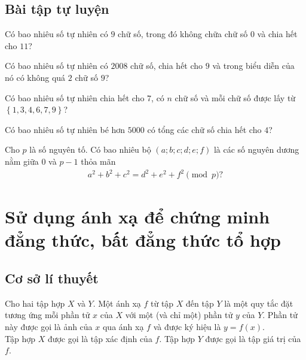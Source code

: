 \subsection{Bài tập tự luyện}
\begin{bt}
	Có bao nhiêu số tự nhiên có $ 9 $ chữ số, trong đó không chữa chữ số $ 0 $ và chia hết cho $ 11 $?
\end{bt}

\begin{bt}[VMO 2008]
	Có bao nhiêu số tự nhiên có $ 2008 $ chữ số, chia hết cho $ 9 $ và trong biểu diễn của nó có không quá $ 2 $ chữ số $ 9 $? 
\end{bt}

\begin{bt}
	Có bao nhiêu số tự nhiên chia hết cho $7$, có $n$ chữ số và mỗi chữ số được lấy từ $\left\{1,3,4,6,7,9\right\}$?
\end{bt}

\begin{bt}
	Có bao nhiêu số tự nhiên bé hơn $5000$ có tổng các chữ số chia hết cho $4$?
\end{bt}

\begin{bt}
	Cho $p$ là số nguyên tố. Có bao nhiêu bộ $(a;b;c;d;e;f)$ là các số nguyên dương nằm giữa $0$ và $p-1$ thỏa mãn 
	\begin{align*}
		a^2+b^2+c^2=d^2+e^2+f^2 \pmod{p}?
	\end{align*}
\end{bt}



\section{Sử dụng ánh xạ để chứng minh đẳng thức, bất đẳng thức tổ hợp}
\setcounter{bt}{0}
\subsection{Cơ sở lí thuyết}

\begin{dn}
	Cho hai tập hợp $X$ và $Y$. Một ánh xạ $f$ từ tập $X$ đến tập $Y$ là một quy tắc đặt tương ứng mỗi phần tử $x$ của $X$ với một (và chỉ một) phần tử $y$ của $Y$. Phần tử này được gọi là ảnh của $x$ qua ánh xạ $f$ và được ký hiệu là $y=f(x)$.\\
	Tập hợp $X$ được gọi là tập xác định của $f$. Tập hợp $Y$ được gọi là tập giá trị của $f$.
\end{dn}

